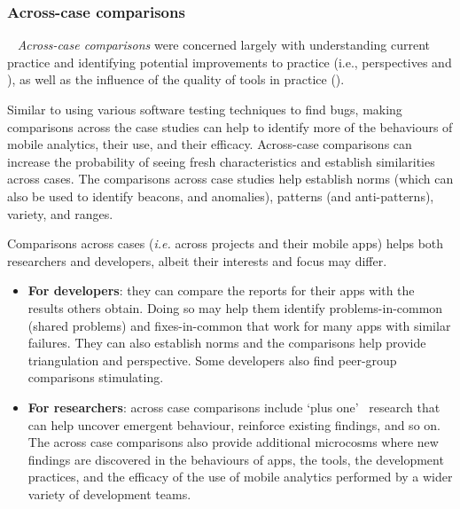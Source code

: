 \subsubsection{Across-case comparisons}~\label{across-case-comparisons-research-method}
\textit{Across-case comparisons} were concerned largely with understanding current practice and identifying potential improvements to practice (i.e., perspectives \uuse and \iuse), as well as the influence of the quality of tools in practice (\itools).

Similar to using various software testing techniques to find bugs, making comparisons across the case studies can help to identify more of the behaviours of mobile analytics, their use, and their efficacy. Across-case comparisons can increase the probability of seeing fresh characteristics and establish similarities across cases. The comparisons across case studies help establish norms (which can also be used to identify beacons, and anomalies), patterns (and anti-patterns), variety, and ranges. 

Comparisons across cases (\textit{i.e.} across projects and their mobile apps) helps both researchers and developers, albeit their interests and focus may differ.

\begin{itemize}
    \item \textbf{For developers}: they can compare the reports for their apps with the results others obtain. Doing so may help them identify problems-in-common (shared problems) and fixes-in-common that work for many apps with similar failures. They can also establish norms and the comparisons help provide triangulation and perspective. Some developers also find peer-group comparisons stimulating.
    
    \item \textbf{For researchers}: across case comparisons include `plus one'~\citep[pp 28-29]{aurini2016_how_to_of_qualitative_research} research that can help uncover emergent behaviour, reinforce existing findings, and so on. The across case comparisons also provide additional microcosms where new findings are discovered in the behaviours of apps, the tools, the development practices, and the efficacy of the use of mobile analytics performed by a wider variety of development teams.
\end{itemize}

